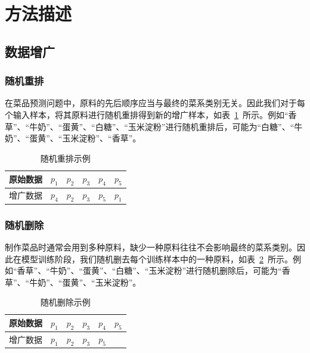 \section{方法描述}

\subsection{数据增广}

\subsubsection{随机重排}

在菜品预测问题中，原料的先后顺序应当与最终的菜系类别无关。因此我们对于每个输入样本，将其原料进行随机重排得到新的增广样本，如表~\ref{tab:randperm}~所示。例如``香草''、``牛奶''、``蛋黄''、``白糖''、``玉米淀粉''进行随机重排后，可能为``白糖''、``牛奶''、``蛋黄''、``玉米淀粉''、``香草''。

\begin{table}[htbp]
    \centering
    \begin{tabular}{lccccc}
        \toprule
        原始数据 & $p_1$ & $p_2$ & $p_3$ & $p_4$ & $p_5$ \\
        \midrule
        增广数据 & $p_4$ & $p_2$ & $p_3$ & $p_5$ & $p_1$ \\
        \bottomrule
    \end{tabular}
    \caption{随机重排示例}
    \label{tab:randperm}
\end{table}

\subsubsection{随机删除}

制作菜品时通常会用到多种原料，缺少一种原料往往不会影响最终的菜系类别。因此在模型训练阶段，我们随机删去每个训练样本中的一种原料，如表~\ref{tab:randdrop}~所示。例如``香草''、``牛奶''、``蛋黄''、``白糖''、``玉米淀粉''进行随机删除后，可能为``香草''、``牛奶''、``蛋黄''、``玉米淀粉''。

\begin{table}[htbp]
    \centering
    \begin{tabular}{lccccc}
        \toprule
        原始数据 & $p_1$ & $p_2$ & $p_3$ & $p_4$ & $p_5$\\
        \midrule
        增广数据 & $p_1$ & $p_2$ & $p_3$ & $p_5$ & \\
        \bottomrule
    \end{tabular}
    \caption{随机删除示例}
    \label{tab:randdrop}
\end{table}

